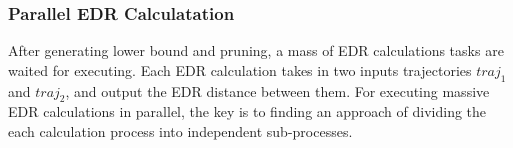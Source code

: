 \documentclass[conference]{IEEEtran}
\begin{document}
%
%		
%		

\subsubsection{Parallel EDR Calculatation}
After generating lower bound and pruning, a mass of EDR calculations tasks are waited for executing. Each EDR calculation takes in two inputs trajectories $traj_1$ and $traj_2$, and output the EDR distance between them. For executing massive EDR calculations in parallel, the key is to finding an approach of dividing the each calculation process into independent sub-processes.  
\end{document}
